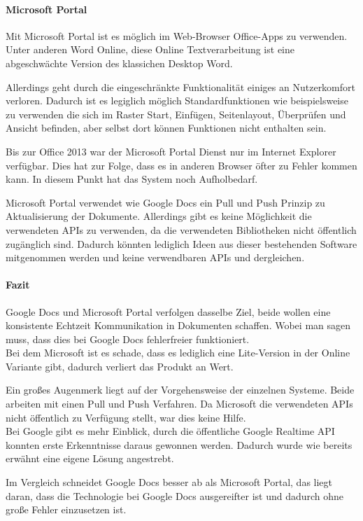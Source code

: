 \newpage

\paragraph{Microsoft Portal}
Mit Microsoft Portal ist es möglich im Web-Browser Office-Apps zu verwenden. Unter anderen Word Online, diese Online Textverarbeitung ist eine abgeschwächte Version des klassichen Desktop Word.

Allerdings geht durch die eingeschränkte Funktionalität einiges an Nutzerkomfort verloren. Dadurch ist es legiglich möglich Standardfunktionen wie beispielsweise zu verwenden die sich im Raster Start, Einfügen, Seitenlayout, Überprüfen und Ansicht befinden, aber selbst dort können Funktionen nicht enthalten sein.

Bis zur Office 2013 war der Microsoft Portal Dienst nur im Internet Explorer verfügbar. Dies hat zur Folge, dass es in anderen Browser öfter zu Fehler kommen kann. In diesem Punkt hat das System noch Aufholbedarf.

Microsoft Portal verwendet wie Google Docs ein Pull und Push Prinzip zu Aktualisierung der Dokumente. Allerdings gibt es keine Möglichkeit die verwendeten APIs zu verwenden, da die verwendeten Bibliotheken nicht öffentlich zugänglich sind. Dadurch könnten lediglich Ideen aus dieser bestehenden Software mitgenommen werden und keine verwendbaren APIs und dergleichen.

\paragraph{Fazit}
Google Docs und Microsoft Portal verfolgen dasselbe Ziel, beide wollen eine konsistente Echtzeit Kommunikation in Dokumenten schaffen. Wobei man sagen muss, dass dies bei Google Docs fehlerfreier funktioniert.\\
Bei dem Microsoft ist es schade, dass es lediglich eine Lite-Version in der Online Variante gibt, dadurch verliert das Produkt an Wert.

Ein großes Augenmerk liegt auf der Vorgehensweise der einzelnen Systeme. Beide arbeiten mit einen Pull und Push Verfahren. Da Microsoft die verwendeten APIs nicht öffentlich zu Verfügung stellt, war dies keine Hilfe.\\
Bei Google gibt es mehr Einblick, durch die öffentliche Google Realtime API konnten erste Erkenntnisse daraus gewonnen werden. Dadurch wurde wie bereits erwähnt eine eigene Lösung angestrebt.

Im Vergleich schneidet Google Docs besser ab als Microsoft Portal, das liegt daran, dass die Technologie bei Google Docs ausgereifter ist und dadurch ohne große Fehler einzusetzen ist.
\newpage

